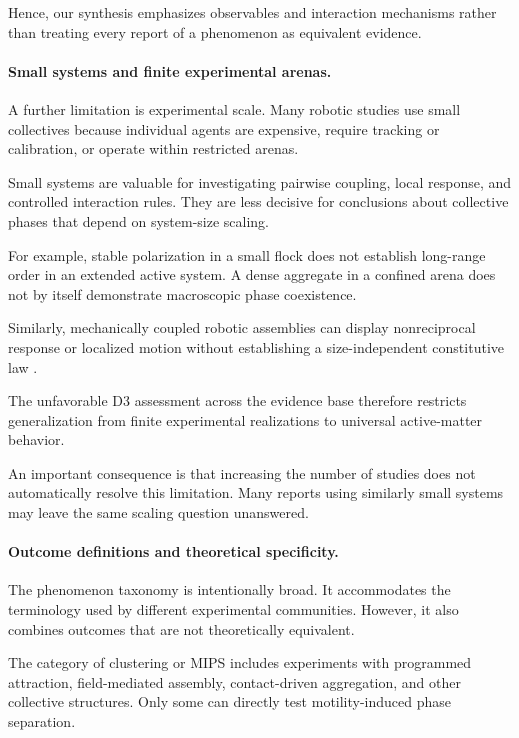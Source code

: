 Hence, our synthesis emphasizes
observables and interaction
mechanisms rather than treating
every report of a phenomenon
as equivalent evidence.

\paragraph*{Small systems and finite experimental arenas.}

A further limitation is experimental scale.
Many robotic studies use small collectives
because individual agents are expensive,
require tracking or calibration,
or operate within restricted arenas.

Small systems are valuable for investigating
pairwise coupling, local response,
and controlled interaction rules.
They are less decisive for conclusions
about collective phases that depend
on system-size scaling.

For example, stable polarization
in a small flock does not
establish long-range order
in an extended active system.
A dense aggregate in a confined
arena does not by itself
demonstrate macroscopic
phase coexistence.

Similarly, mechanically coupled
robotic assemblies can display
nonreciprocal response or
localized motion without
establishing a size-independent
constitutive law
\cite{Brandenbourger2019nonreciprocalrobot,Brandenbourger2021limitcyclesturnac,Binysh2026moreislessinunpe,Coulais2025activemetamaterials}.

The unfavorable D3 assessment
across the evidence base
therefore restricts generalization
from finite experimental
realizations to universal
active-matter behavior.

An important consequence is
that increasing the number
of studies does not
automatically resolve
this limitation.
Many reports using
similarly small systems
may leave the same
scaling question unanswered.

\paragraph*{Outcome definitions and theoretical specificity.}

The phenomenon taxonomy is intentionally broad.
It accommodates the terminology used by
different experimental communities.
However, it also combines outcomes
that are not theoretically equivalent.

The category of clustering or MIPS
includes experiments with programmed
attraction, field-mediated assembly,
contact-driven aggregation,
and other collective structures.
Only some can directly test
motility-induced phase separation.

